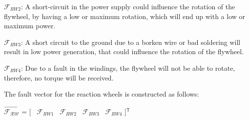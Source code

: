 $\mathcal{F}_{RW2}$: 
A short-circuit in the power supply could influence the rotation of the flywheel, by having a low or maximum rotation, which will end up with a low or maximum power.

$\mathcal{F}_{RW3}$:
A short circuit to the ground due to a borken wire or bad soldering will result in low power generation, that could influence the rotation of the flywheel.

$\mathcal{F}_{RW4}$:  
Due to a fault in the windings, the flywheel will not be able to rotate, therefore, no torque will be received.

The fault vector for the reaction wheels is constructed as follows:

$\mathcal {\vec{{F}_{RW}}}$ = [ \ $\mathcal{F}_{RW1}$ \ $\mathcal{F}_{RW2}$ \ $\mathcal{F}_{RW3}$ \ $\mathcal{F}_{RW4}$ ]$^ \mathsf{T}$
